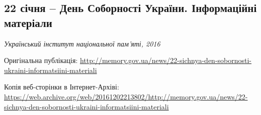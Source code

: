 
 
 
 
 

\subsection{22 січня – День Соборності України. Інформаційні матеріали}
\label{sec:2016.uinp.22_sichnja_den_sobornosti_ukrainy}

\emph{Український інститут національної пам'яті, 2016}

\begin{center}
\item Оригінальна публікація: \url{http://memory.gov.ua/news/22-sichnya-den-sobornosti-ukraini-informatsiini-materiali}
\item Копія веб-сторінки в Інтернет-Архіві: \url{https://web.archive.org/web/20161202213802/http://memory.gov.ua/news/22-sichnya-den-sobornosti-ukraini-informatsiini-materiali}
\end{center}


